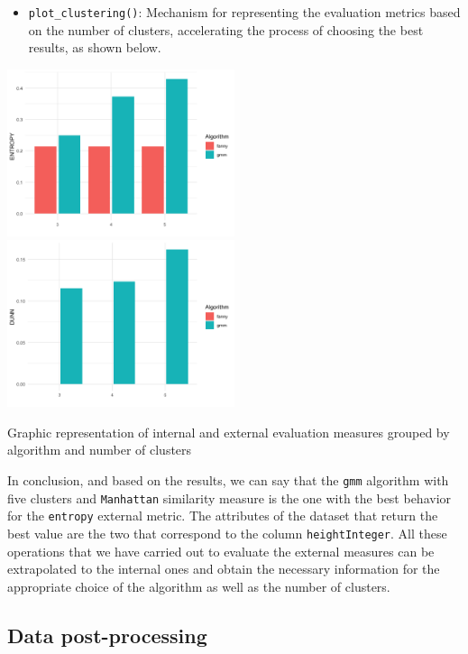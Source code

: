 \documentclass[
]{article}
\providecommand{\tightlist}{%
  \setlength{\itemsep}{0pt}\setlength{\parskip}{0pt}}
\begin{document}
\begin{itemize}
\tightlist
\item
  \texttt{plot\_clustering()}: Mechanism for representing the evaluation
  metrics based on the number of clusters, accelerating the process of
  choosing the best results, as shown below.
\end{itemize}

\hypertarget{fig:coolFig}{}
\includegraphics[width=0.5\textwidth,height=\textheight]{img/entropy.png}
\includegraphics[width=0.5\textwidth,height=\textheight]{img/dunn.png}

Graphic representation of internal and external evaluation measures
grouped by algorithm and number of clusters

In conclusion, and based on the results, we can say that the
\texttt{gmm} algorithm with five clusters and \texttt{Manhattan}
similarity measure is the one with the best behavior for the
\texttt{entropy} external metric. The attributes of the dataset that
return the best value are the two that correspond to the column
\texttt{heightInteger}. All these operations that we have carried out to
evaluate the external measures can be extrapolated to the internal ones
and obtain the necessary information for the appropriate choice of the
algorithm as well as the number of clusters.

\hypertarget{data-post-processing}{%
\subsection{Data post-processing}\label{data-post-processing}}
\end{document}
